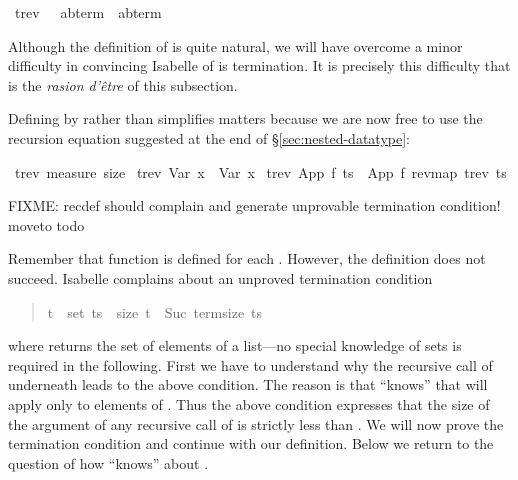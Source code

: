 \begin{isabelle}%
\ trev\ \ {\isacharcolon}{\isacharcolon}\ {\isachardoublequote}{\isacharparenleft}{\isacharprime}a{\isacharcomma}{\isacharprime}b{\isacharparenright}term\ {\isacharequal}{\isachargreater}\ {\isacharparenleft}{\isacharprime}a{\isacharcomma}{\isacharprime}b{\isacharparenright}term{\isachardoublequote}%
\begin{isamarkuptext}%
\noindent
Although the definition of  is quite natural, we will have
overcome a minor difficulty in convincing Isabelle of is termination.
It is precisely this difficulty that is the \textit{rasion d'\^etre} of
this subsection.

Defining  by  rather than 
simplifies matters because we are now free to use the recursion equation
suggested at the end of \S\ref{sec:nested-datatype}:%
\end{isamarkuptext}%
\ trev\ {\isachardoublequote}measure\ size{\isachardoublequote}\isanewline
\ {\isachardoublequote}trev\ {\isacharparenleft}Var\ x{\isacharparenright}\ {\isacharequal}\ Var\ x{\isachardoublequote}\isanewline
\ {\isachardoublequote}trev\ {\isacharparenleft}App\ f\ ts{\isacharparenright}\ {\isacharequal}\ App\ f\ {\isacharparenleft}rev{\isacharparenleft}map\ trev\ ts{\isacharparenright}{\isacharparenright}{\isachardoublequote}%
\begin{isamarkuptext}%
FIXME: recdef should complain and generate unprovable termination condition!
moveto todo

Remember that function  is defined for each .
However, the definition does not succeed. Isabelle complains about an unproved termination
condition
\begin{quote}

\begin{isabelle}%
\mbox{t}\ {\isasymin}\ set\ \mbox{ts}\ {\isasymlongrightarrow}\ size\ \mbox{t}\ {\isacharless}\ Suc\ {\isacharparenleft}term{\isacharunderscore}size\ \mbox{ts}{\isacharparenright}
\end{isabelle}%

\end{quote}
where  returns the set of elements of a list---no special knowledge of sets is
required in the following.
First we have to understand why the recursive call of  underneath  leads
to the above condition. The reason is that  ``knows'' that  will
apply  only to elements of . Thus the above condition expresses that
the size of the argument  of any recursive call of  is strictly
less than .
We will now prove the termination condition and continue with our definition.
Below we return to the question of how  ``knows'' about .%
\end{isamarkuptext}%
\end{isabelle}%
